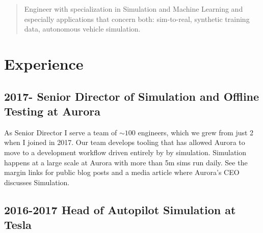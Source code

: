 \maketitle
{}


\begin{abstract}
Engineer with specialization in Simulation and Machine Learning and especially applications that concern both: sim-to-real, synthetic training data, autonomous vehicle simulation.
\end{abstract}

\section{Experience}

\subsection{2017- Senior Director of Simulation and Offline Testing at Aurora}


As Senior Director I serve a team of $\sim\!\!100$ engineers, which we grew from just 2 when I joined in 2017. Our team develops tooling that has allowed Aurora to move to a development workflow driven entirely by by simulation. Simulation happens at a large scale at Aurora with more than 5m sims run daily. See the margin links for public blog posts and a media article where Aurora's CEO discusses Simulation.

\subsection{2016-2017 Head of Autopilot Simulation at Tesla}

